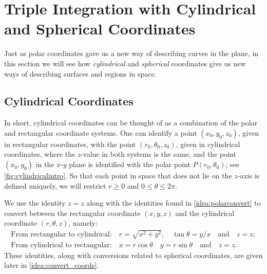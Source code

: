 \section{Triple Integration with Cylindrical and Spherical Coordinates}\label{sec:cylindrical_spherical}

Just as polar coordinates gave us a new way of describing curves in the plane, in this section we will see how \emph{cylindrical} and \emph{spherical} coordinates give us new ways of describing surfaces and regions in space.

\subsection{Cylindrical Coordinates}

In short, cylindrical coordinates can be thought of as a combination of the polar and rectangular coordinate systems. %
One can identify a point $(x_0,y_0,z_0)$, given in rectangular coordinates, with the point $(r_0,\theta_0,z_0)$, given in cylindrical coordinates, where the $z$-value in both systems is the same, and the point $(x_0,y_0)$ in the $x$-$y$ plane is identified with the polar point $P(r_0,\theta_0)$; see \autoref{fig:cylindricalintro}. So that each point in space that does not lie on the $z$-axis is defined uniquely, we will restrict $r\geq 0$ and $0\leq \theta\leq 2\pi$.
%

We use the identity $z=z$ along with the identities found in \autoref{idea:polarconvert} to convert between the  rectangular coordinate $(x,y,z)$ and the  cylindrical coordinate $(r,\theta,z)$, namely:
\[
\begin{array}{l}
\text{From rectangular to cylindrical:}\quad r=\sqrt{x^2+y^2},\quad \tan\theta = y/x \quad\text{and}\quad z=z;\\
\text{From cylindrical to rectangular:} \quad x=r\cos\theta\quad y=r\sin\theta\quad \text{and}\quad z=z.\end{array}
\]
These identities, along with conversions related to spherical coordinates, are given later in \autoref{idea:convert_coords}.

